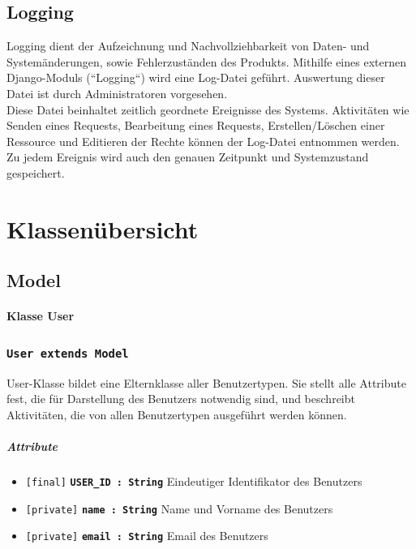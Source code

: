 \documentclass[parskip=full,11pt]{scrartcl}
\newcommand{\class}[1]{\subsubsection*{\lstinline[basicstyle=\ttfamily\large]{#1}}}
\newcommand{\atr}[4]{\lstinline{[#3]} \textbf{\lstinline{#1 : #2}} \newline #4}
\begin{document}
 \subsection{Logging}
Logging dient der Aufzeichnung und Nachvollziehbarkeit von Daten- und Systemänderungen, sowie Fehlerzuständen des Produkts. Mithilfe eines externen Django-Moduls (``Logging``) wird eine Log-Datei geführt. Auswertung dieser Datei ist durch Administratoren vorgesehen. \\
Diese Datei beinhaltet zeitlich geordnete Ereignisse des Systems. Aktivitäten wie Senden eines Requests, Bearbeitung eines Requests, Erstellen/Löschen einer Ressource und Editieren der Rechte können der Log-Datei entnommen werden. Zu jedem Ereignis wird auch den genauen Zeitpunkt und Systemzustand gespeichert.
 
 
 \newpage
 \section{Klassenübersicht}
 \subsection{Model}
 \paragraph*{Klasse User}
 \class{User extends Model}
User-Klasse bildet eine Elternklasse aller Benutzertypen. Sie stellt alle Attribute fest, die für Darstellung des Benutzers notwendig sind, und beschreibt Aktivitäten, die von allen Benutzertypen ausgeführt werden können.
\subparagraph*{Attribute} %
\begin{itemize}
	\item \atr{USER_ID}{String}{final} {Eindeutiger Identifikator des Benutzers}
	\item \atr{name}{String}{private}{Name und Vorname des Benutzers}	
	\item \atr{email}{String}{private}{Email des Benutzers}
\end{itemize}
\end{document}
